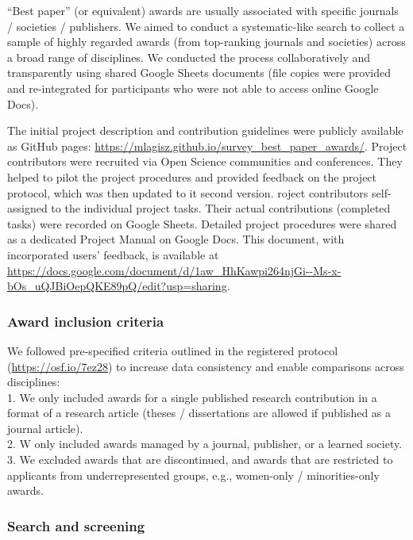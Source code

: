 \documentclass[
]{article}
\begin{document}
``Best paper'' (or equivalent) awards are usually associated with
specific journals / societies / publishers. We aimed to conduct a
systematic-like search to collect a sample of highly regarded awards
(from top-ranking journals and societies) across a broad range of
disciplines. We conducted the process collaboratively and transparently
using shared Google Sheets documents (file copies were provided and
re-integrated for participants who were not able to access online Google
Docs).

The initial project description and contribution guidelines were
publicly available as GitHub pages:
\url{https://mlagisz.github.io/survey_best_paper_awards/}. Project
contributors were recruited via Open Science communities and
conferences. They helped to pilot the project procedures and provided
feedback on the project protocol, which was then updated to it second
version. roject contributors self-assigned to the individual project
tasks. Their actual contributions (completed tasks) were recorded on
Google Sheets. Detailed project procedures were shared as a dedicated
Project Manual on Google Docs. This document, with incorporated users'
feedback, is available at
\url{https://docs.google.com/document/d/1aw_HhKawpi264njGi--Ms-x-bOs_uQJBiOepQKE89pQ/edit?usp=sharing}.

\hypertarget{award-inclusion-criteria}{%
\subsubsection{Award inclusion
criteria}\label{award-inclusion-criteria}}

We followed pre-specified criteria outlined in the registered protocol
(\url{https://osf.io/7ez28}) to increase data consistency and enable
comparisons across disciplines:\\
1. We only included awards for a single published research contribution
in a format of a research article (theses / dissertations are allowed if
published as a journal article).\\
2. W only included awards managed by a journal, publisher, or a learned
society.\\
3. We excluded awards that are discontinued, and awards that are
restricted to applicants from underrepresented groups, e.g., women-only
/ minorities-only awards.

\hypertarget{search-and-screening}{%
\subsubsection{Search and screening}\label{search-and-screening}}
\end{document}
